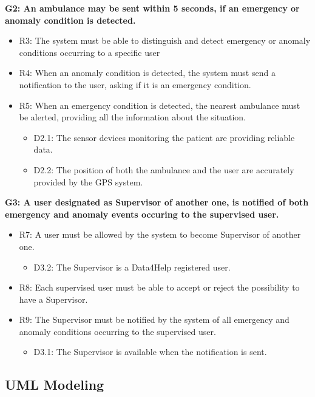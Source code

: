 \textbf{ G2: An ambulance may be sent within 5 seconds, if an emergency or anomaly condition is detected.}

\begin{itemize}
	\item R3: The system must be able to distinguish and detect emergency or anomaly conditions occurring to a specific user
	\item R4: When an anomaly condition is detected, the system must send a notification to the user, asking if it is an emergency condition.
	\item R5: When an emergency condition is detected, the nearest ambulance must be alerted, providing all the information about the situation.
	\begin{itemize}
		\item D2.1: The sensor devices monitoring the patient are providing reliable data.
		\item D2.2: The position of both the ambulance and the user are accurately provided by the GPS system.
	\end{itemize}
\end{itemize}

\textbf{G3: A user designated as Supervisor of another one, is notified of both emergency and anomaly events occuring to the supervised user.}

\begin{itemize}[itemsep=0em]
	\item R7: A user must be allowed by the system to become Supervisor of another one.
	\begin{itemize}
		\item D3.2: The Supervisor is a Data4Help registered user.
	\end{itemize}
	\item R8: Each supervised user must be able to accept or reject the possibility to have a Supervisor.
	\item R9: The Supervisor must be notified by the system of all emergency and anomaly conditions occurring to the supervised user.
	\begin{itemize}[topsep=0em]
		\item D3.1: The Supervisor is available when the notification is sent.
	\end{itemize}
\end{itemize}

{\color{Blue}\subsection{UML Modeling}}

